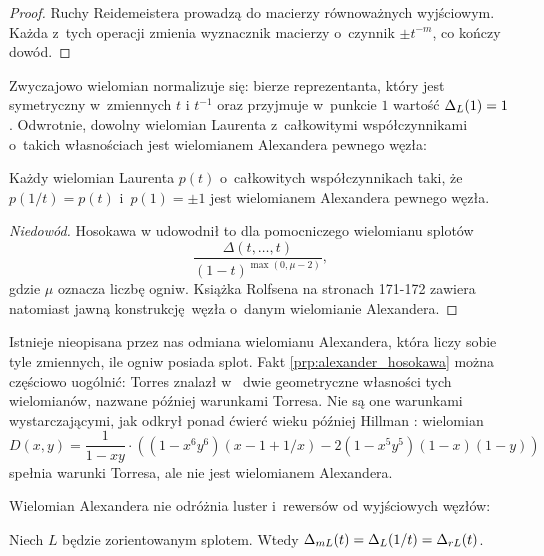 \begin{proof}
    Ruchy Reidemeistera prowadzą do macierzy równoważnych wyjściowym.
    Każda z~tych operacji zmienia wyznacznik macierzy o~czynnik $\pm t^{-m}$, co kończy dowód.
\end{proof}

Zwyczajowo wielomian normalizuje się: bierze reprezentanta, który jest symetryczny w~zmiennych $t$ i $t^{-1}$ oraz przyjmuje w~punkcie $1$ wartość $\Delta_L(1) = 1$.
Odwrotnie, dowolny wielomian Laurenta z~całkowitymi współczynnikami o~takich własnościach jest wielomianem Alexandera pewnego węzła:

\begin{proposition}
    \label{prp:alexander_hosokawa}
    Każdy wielomian Laurenta $p(t)$ o~całkowitych współczynnikach taki, że $p(1/t) = p(t)$ i~$p(1) = \pm 1$ jest wielomianem Alexandera pewnego węzła.
\end{proposition}

\begin{proof}[Niedowód]
    Hosokawa w \cite{hosokawa58} udowodnił to dla pomocniczego wielomianu splotów
    \begin{equation}
        \frac{\Delta(t, \ldots, t)}{(1-t)^{\max(0, \mu - 2)}},
    \end{equation}
    gdzie $\mu$ oznacza liczbę ogniw.
    Książka \cite{rolfsen76} Rolfsena na stronach 171-172 zawiera natomiast jawną konstrukcję węzła o~danym wielomianie Alexandera.
\end{proof}

Istnieje nieopisana przez nas odmiana wielomianu Alexandera, która liczy sobie tyle zmiennych, ile ogniw posiada splot.
Fakt \ref{prp:alexander_hosokawa} można częściowo uogólnić: Torres znalazł w~\cite{torres53} dwie geometryczne własności tych wielomianów, nazwane później warunkami Torresa.
Nie są one warunkami wystarczającymi, jak odkrył ponad ćwierć wieku później Hillman \cite{hillman81}: wielomian
\begin{equation}
    D(x,y) = \frac{1}{1-xy} \cdot \left((1 - x^6y^6)(x - 1 + 1/x) - 2(1 - x^5y^5)(1 - x)(1 - y)\right)
\end{equation}
spełnia warunki Torresa, ale nie jest wielomianem Alexandera.

Wielomian Alexandera nie odróżnia luster i~rewersów od wyjściowych węzłów:

\begin{proposition}
    Niech $L$ będzie zorientowanym splotem.
    Wtedy $\Delta_{mL}(t) = \Delta_L(1/t) = \Delta_{rL}(t)$.
\end{proposition}

